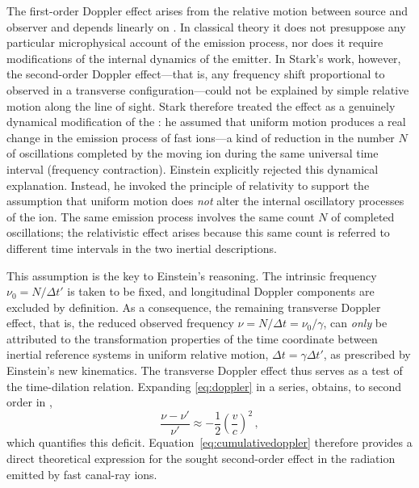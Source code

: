 \documentclass[submitted,12pt]{article}
\newcommand{\tDe}{transverse Doppler effect\xspace}
\begin{document}
The first-order Doppler effect arises from the relative motion between source and observer and depends linearly on \betafactorh. In classical theory it does not presuppose any particular microphysical account of the emission process, nor does it require modifications of the internal dynamics of the emitter. In Stark’s work, however, the second-order Doppler effect—that is, any frequency shift proportional to \betafactorsquaredh observed in a transverse configuration—could not be explained by simple relative motion along the line of sight. Stark therefore treated the effect as a genuinely dynamical modification of the : he assumed that uniform motion produces a real change in the emission process of fast ions---a kind of reduction in the number $N$ of oscillations completed by the moving ion during the same universal time interval (frequency contraction). Einstein explicitly rejected this dynamical explanation. Instead, he invoked the principle of relativity to support the assumption that uniform motion does \emph{not} alter the internal oscillatory processes of the ion. The same emission process involves the same count $N$ of completed oscillations; the relativistic effect arises because this same count is referred to different time intervals in the two inertial descriptions.


This assumption is the key to Einstein’s reasoning. The intrinsic frequency $\nu_0=N/\Delta t'$ is taken to be fixed, and longitudinal Doppler components are excluded by definition. As a consequence, the remaining transverse Doppler effect, that is, the reduced observed frequency $\nu = N/\Delta t = \nu_0/\gamma$, can \emph{only} be attributed to the transformation properties of the time coordinate between inertial reference systems in uniform relative motion, $\Delta t=\gamma\Delta t'$, as prescribed by Einstein’s new kinematics. The \tDe thus serves as a test of the time-dilation relation. Expanding \cref{eq:doppler} in a series, \citet[197]{Einstein1907d} obtains, to second order in \betafactorh,
%
\begin{equation}\label{eq:cumulativedoppler}
\frac{\nu-\nu'}{\nu'} \approx -\frac{1}{2}\left(\frac{v}{c}\right)^2\,,
\end{equation}
%
which quantifies this deficit. Equation~\eqref{eq:cumulativedoppler} therefore provides a direct theoretical expression for the sought second-order effect in the radiation emitted by fast canal-ray ions.
\end{document}
